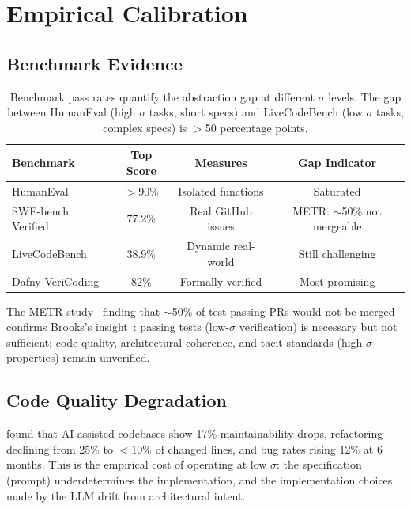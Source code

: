 \documentclass[11pt, a4paper, copyright]{googledeepmind}
\begin{document}
\section{Empirical Calibration}
\label{sec:empirical}

\subsection{Benchmark Evidence}

\begin{table}[H]
\centering
\small
\begin{tabular}{lccc}
\toprule
\textbf{Benchmark} & \textbf{Top Score} & \textbf{Measures} & \textbf{Gap Indicator} \\
\midrule
HumanEval & $>$90\% & Isolated functions & Saturated \\
SWE-bench Verified & 77.2\% & Real GitHub issues & METR: $\sim$50\% not mergeable \\
LiveCodeBench & 38.9\% & Dynamic real-world & Still challenging \\
Dafny VeriCoding & 82\% & Formally verified & Most promising \\
\bottomrule
\end{tabular}
\caption{Benchmark pass rates quantify the abstraction gap at different $\sigma$ levels. The gap between HumanEval (high $\sigma$ tasks, short specs) and LiveCodeBench (low $\sigma$ tasks, complex specs) is $>$50 percentage points.}
\label{tab:benchmarks}
\end{table}

The METR study~\citep{metr2026swebench} finding that $\sim$50\% of test-passing PRs would not be merged confirms Brooks's insight~\citep{brooks1987nosilver}: passing tests (low-$\sigma$ verification) is necessary but not sufficient; code quality, architectural coherence, and tacit standards (high-$\sigma$ properties) remain unverified.

\subsection{Code Quality Degradation}

\citet{gitclear2025quality} found that AI-assisted codebases show 17\% maintainability drops, refactoring declining from 25\% to $<$10\% of changed lines, and bug rates rising 12\% at 6 months. This is the empirical cost of operating at low $\sigma$: the specification (prompt) underdetermines the implementation, and the implementation choices made by the LLM drift from architectural intent.
\end{document}
